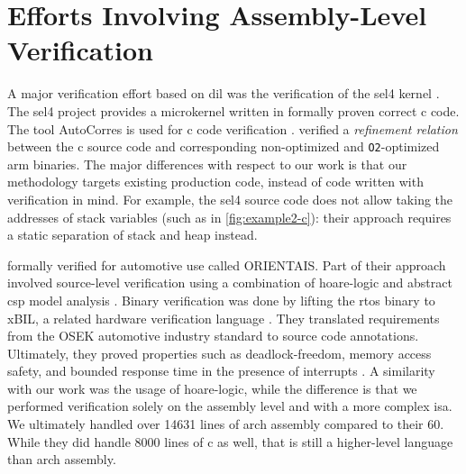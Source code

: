 \begin{comment}
  Building on such models (specifically, the \gls{arm} specification), \textcite{jiang2022examiner} checked for inconsistencies and bugs in \gls{cpu} emulators such as \gls{qemu} and \texttt{angr}\index{angr}.
  They were able to uncover thousands of situations where the instruction stream generated according to the official specification did not match up to that produced by emulators.
  They also uncovered twelve bugs that influenced the behavior of various common instructions.
  We perform a similar validation of our modeling of library functions for exception handling purposes in \cref{ch:eicfg-validation}.
  However, we lack a structured specification to generate semantics from or test against, so we tested against real-world implementations instead (and uncovered several bugs in our model).
\end{comment}

\section{Efforts Involving Assembly-Level Verification}
\label{se:integrated_assembly}
A major verification effort based on \gls{dil}
was the verification of the \gls{sel4} kernel \autocite{klein2009sel4,klein2014comprehensive}.
The \gls{sel4} project provides a microkernel written in formally proven correct \gls{c} code.
The tool AutoCorres is used for \gls{c} code verification \autocite{greenaway2012bridging}.
\Textcite{sewell2013tvv} verified a \emph{refinement relation} between the \gls{c} source code
and corresponding non-optimized and \lstinline|O2|-optimized \gls{arm} binaries.
The major differences with respect to our work
is that our methodology targets existing production code,
instead of code written with verification in mind.
For example, the \gls{sel4} source code does not allow taking the addresses of stack variables
(such as in \cref{fig:example2-c}):
their approach requires a static separation of stack and heap instead.

\Textcite{shi2012orientais} formally verified  for automotive use
called ORIENTAIS.
Part of their approach involved source-level verification
using a combination of \gls{hoare-logic}
and abstract \gls{csp} model analysis \autocite{hoare1978csp}.
Binary verification was done by lifting the \gls{rtos} binary to xBIL,
a related hardware verification language \autocite{shi2012xbil}.
They translated requirements from the OSEK automotive industry standard
to source code annotations.
Ultimately, they proved properties such as deadlock-freedom, memory access safety,
and bounded response time in the presence of interrupts \autocite{shi2012interrupt}.
A similarity with our work was the usage of \gls{hoare-logic},
while the difference is that we performed verification solely on the assembly level
and with a more complex \gls{isa}.
We ultimately handled over \num{14631} lines of \gls{arch} assembly compared to their \num{60}.
While they did handle \num{8000} lines of \gls{c} as well,
that is still a higher-level language than \gls{arch} assembly.

